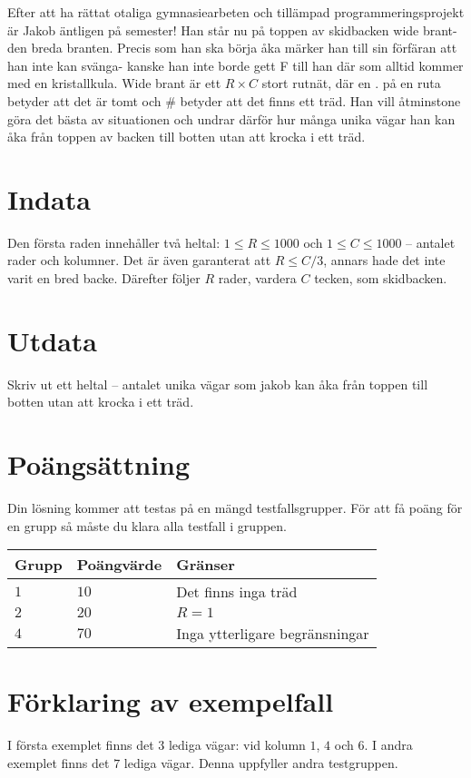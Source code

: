 Efter att ha rättat otaliga gymnasiearbeten och tillämpad programmeringsprojekt är Jakob äntligen på semester! Han står nu på toppen av skidbacken wide brant- den breda branten.
Precis som han ska börja åka märker han till sin förfäran att han inte kan svänga- kanske han inte borde gett F till han där som alltid kommer med en kristallkula.
Wide brant är ett $R\times C$ stort rutnät, där en . på en ruta betyder att det är tomt och \# betyder att det finns ett träd. 
Han vill åtminstone göra det bästa av situationen och undrar därför hur många unika vägar han kan åka från toppen av backen till botten utan att krocka i ett träd.

\section*{Indata}
Den första raden innehåller två heltal: $1\leq R \leq 1000$ och $1 \leq C \leq 1000$ -- antalet rader och kolumner. Det är även garanterat att $R \leq C/3$, annars hade det inte varit en bred backe.
Därefter följer $R$ rader, vardera $C$ tecken, som skidbacken. 

\section*{Utdata}
Skriv ut ett heltal -- antalet unika vägar som jakob kan åka från toppen till botten utan att krocka i ett träd.

\section*{Poängsättning}
Din lösning kommer att testas på en mängd testfallsgrupper.
För att få poäng för en grupp så måste du klara alla testfall i gruppen.

\noindent
\begin{tabular}{| l | l | p{12cm} |}
  \hline
  Grupp & Poängvärde & Gränser \\ \hline
  $1$   & $10$       & Det finns inga träd \\ \hline
  $2$   & $20$       & $R=1$ \\ \hline
  $4$   & $70$       & Inga ytterligare begränsningar  \\ \hline
\end{tabular}

\section*{Förklaring av exempelfall}
I första exemplet finns det $3$ lediga vägar: vid kolumn $1$, $4$ och $6$.
I andra exemplet finns det $7$ lediga vägar. Denna uppfyller andra testgruppen.
